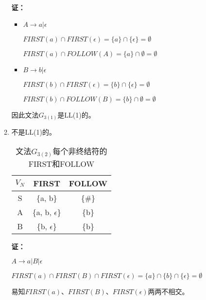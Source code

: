 \begin{enumerate}[1.]
\begin{enumerate}[(1)]
            \textbf{证：}
            
            \begin{itemize}
                \item $A \to a | \epsilon$
                
                $FIRST(a) \cap FIRST(\epsilon) = \{a\} \cap \{\epsilon\} = \emptyset$
                
                $FIRST(a) \cap FOLLOW(A) = \{a\} \cap \emptyset = \emptyset$
                
                \item $B \to b | \epsilon$
                
                $FIRST(b) \cap FIRST(\epsilon) = \{b\} \cap \{\epsilon\} = \emptyset$
                
                $FIRST(b) \cap FOLLOW(B) = \{b\} \cap \emptyset = \emptyset$
            \end{itemize}
            
            因此文法$G_{3(1)}$是LL(1)的。
            
            \item 不是LL(1)的。
            \begin{table}[H]
                \centering
                \begin{tabular}{|c|c|c|}
                    \hline
                    $V_N$ & FIRST & FOLLOW \\
                    \hline
                    S & \{a, b\} & \{\#\} \\
                    \hline
                    A & \{a, b, $\epsilon$\} & \{b\} \\
                    \hline
                    B & \{b, $\epsilon$\} & \{b\} \\
                    \hline
                \end{tabular}
                \caption{文法$G_{3(2)}$每个非终结符的FIRST和FOLLOW}
                \label{tab:G3_2FF}
            \end{table}
            
            \textbf{证：}
            
            $A \to a | B | \epsilon$
                
            $FIRST(a) \cap FIRST(B) \cap FIRST(\epsilon) = \{a\} \cap \{b\} \cap \{\epsilon\} = \emptyset$
            
            易知$FIRST(a)、 FIRST(B)、 FIRST(\epsilon)$两两不相交。
            

\end{enumerate}
\end{enumerate}
